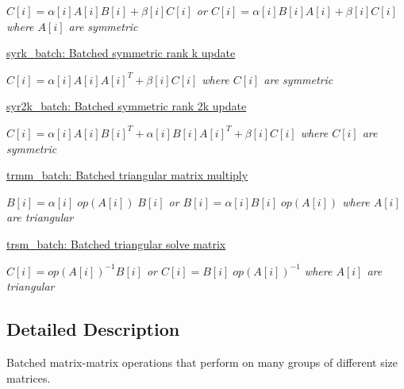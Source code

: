 \begin{DoxyCompactItemize}
\begin{DoxyCompactList}\small\item\em $ C[i] = \alpha[i] A[i] B[i] + \beta[i] C[i] $ or $ C[i] = \alpha[i] B[i] A[i] + \beta[i] C[i] $ where $ A[i] $ are symmetric \end{DoxyCompactList}\item 
\hyperlink{group__syrk__batch}{syrk\+\_\+batch\+: Batched symmetric rank k update}
\begin{DoxyCompactList}\small\item\em $ C[i] = \alpha[i] A[i] A[i]^T + \beta[i] C[i] $ where $ C[i] $ are symmetric \end{DoxyCompactList}\item 
\hyperlink{group__syr2k__batch}{syr2k\+\_\+batch\+: Batched symmetric rank 2k update}
\begin{DoxyCompactList}\small\item\em $ C[i] = \alpha[i] A[i] B[i]^T + \alpha[i] B[i] A[i]^T + \beta[i] C[i] $ where $ C[i] $ are symmetric \end{DoxyCompactList}\item 
\hyperlink{group__trmm__batch}{trmm\+\_\+batch\+: Batched triangular matrix multiply}
\begin{DoxyCompactList}\small\item\em $ B[i] = \alpha[i] \;op(A[i])\; B[i] $ or $ B[i] = \alpha[i] B[i] \;op(A[i]) $ where $ A[i] $ are triangular \end{DoxyCompactList}\item 
\hyperlink{group__trsm__batch}{trsm\+\_\+batch\+: Batched triangular solve matrix}
\begin{DoxyCompactList}\small\item\em $ C[i] = op(A[i])^{-1} B[i] $ or $ C[i] = B[i] \;op(A[i])^{-1} $ where $ A[i] $ are triangular \end{DoxyCompactList}\end{DoxyCompactItemize}


\subsection{Detailed Description}
Batched matrix-\/matrix operations that perform on many groups of different size matrices. 

